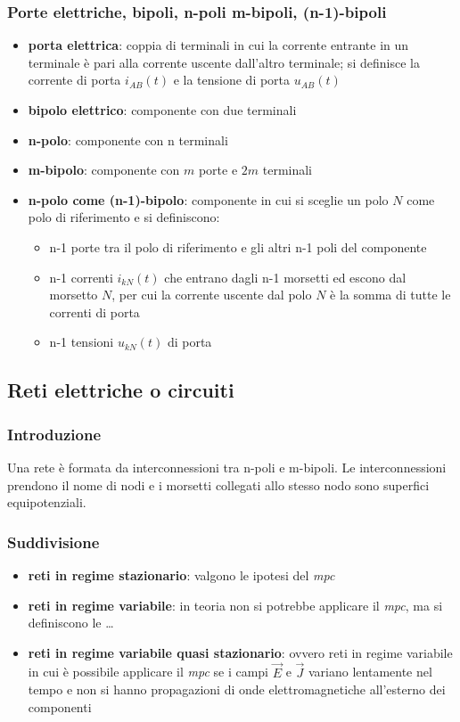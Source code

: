 \documentclass[a4paper]{article}
\begin{document}
\subsubsection*{Porte elettriche, bipoli, n-poli m-bipoli, (n-1)-bipoli}
\begin{itemize}
	\item \textbf{porta elettrica}: coppia di terminali in cui la corrente entrante in un terminale è pari alla corrente uscente
	dall'altro terminale; si definisce la corrente di porta \(i_{AB}(t)\) e la tensione di porta \(u_{AB}(t)\)
	\item \textbf{bipolo elettrico}: componente con due terminali
	\item \textbf{n-polo}: componente con n terminali
	\item \textbf{m-bipolo}: componente con \(m\) porte e \(2m\) terminali
	\item \textbf{n-polo come (n-1)-bipolo}: componente in cui si sceglie un polo \(N\) come polo di riferimento e si definiscono:
	\begin{itemize}[topsep=0pt]
		\item n-1 porte tra il polo di riferimento e gli altri n-1 poli del componente
		\item n-1 correnti \(i_{kN}(t)\) che entrano dagli n-1 morsetti ed escono dal morsetto \(N\), per cui la corrente uscente
		dal polo \(N\) è la somma di tutte le correnti di porta
		\item n-1 tensioni \(u_{kN}(t)\) di porta
	\end{itemize}
\end{itemize}

\subsection{Reti elettriche o circuiti}
\subsubsection*{Introduzione}
Una rete è formata da interconnessioni tra n-poli e m-bipoli. Le interconnessioni prendono il nome di nodi e i morsetti collegati
allo stesso nodo sono superfici equipotenziali.

\subsubsection*{Suddivisione}
\begin{itemize}
	\item \textbf{reti in regime stazionario}: valgono le ipotesi del \textit{mpc}
	\item \textbf{reti in regime variabile}: in teoria non si potrebbe applicare il \textit{mpc}, ma si definiscono le \dots
	\item \textbf{reti in regime variabile quasi stazionario}: ovvero reti in regime variabile in cui è possibile applicare
	il \textit{mpc} se i campi \(\vec{E}\) e \(\vec{J}\) variano lentamente nel tempo e non si hanno propagazioni di onde
	elettromagnetiche all'esterno dei componenti
\end{itemize}
\end{document}
